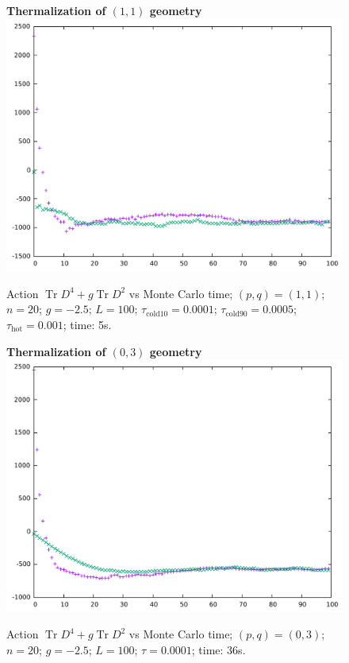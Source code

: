 \documentclass[12pt,a4paper]{article}
\DeclareMathOperator{\Tr}{Tr}
\begin{document}
\newpage

\begin{figure}[hp]
\centering
\textbf{Thermalization of $(1,1)$ geometry}
\includegraphics[width=1\linewidth]{p1q1n20g25.pdf}
\caption{Action $\Tr D^4 + g\Tr D^2$ vs Monte Carlo time; $(p,q)=(1,1)$; $n=20$; $g=-2.5$; $L=100$; $\tau_\text{cold10} = 0.0001$; $\tau_\text{cold90} = 0.0005$; $\tau_\text{hot} = 0.001$; time: 5s.}
\end{figure}

\newpage

\begin{figure}[hp]
\centering
\textbf{Thermalization of $(0,3)$ geometry}
\includegraphics[width=1\linewidth]{p0q3n20g25.pdf}
\caption{Action $\Tr D^4 + g\Tr D^2$ vs Monte Carlo time; $(p,q)=(0,3)$; $n=20$; $g=-2.5$; $L=100$; $\tau = 0.0001$; time: 36s.}
\end{figure}
\end{document}
